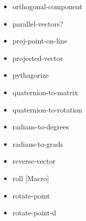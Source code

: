 \documentclass [11pt]{book}
\begin{document}
\begin{itemize}
\item {}orthogonal-component





\item {}parallel-vectors?





\item {}proj-point-on-line





\item {}projected-vector





\item {}pythagorize





\item {}quaternion-to-matrix





\item {}quaternion-to-rotation





\item {}radians-to-degrees





\item {}radians-to-grads





\item {}reverse-vector





\item {}roll [Macro]





\item {}rotate-point





\item {}rotate-point-d






\end{itemize}
\end{document}
